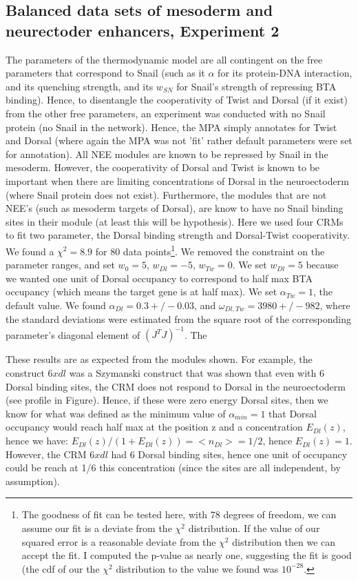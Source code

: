 \subsection{Balanced data sets of mesoderm and neurectoder enhancers, Experiment 2}
The parameters of the thermodynamic model are all contingent on the free parameters that correspond to Snail (such as it $\alpha$ for its protein-DNA interaction, and its quenching strength, and its $w_{SN}$ for Snail's strength of repressing BTA binding).  Hence, to disentangle the cooperativity of Twist and Dorsal (if it exist) from the other free parameters, an experiment was conducted with no Snail protein (no Snail in the network).  Hence, the MPA simply annotates for Twist and Dorsal (where again the MPA was not 'fit' rather default parameters were set for annotation).  All NEE modules are known to be repressed by Snail in the mesoderm.  However, the cooperativity of Dorsal and Twist is known to be important when there are limiting concentrations of Dorsal in the neuroectoderm (where Snail protein does not exist).  Furthermore, the modules that are not NEE's (such as mesoderm targets of Dorsal), are know to have no Snail binding sites in their module (at least this will be hypothesis).  Here we used four CRMs to fit two parameter, the Dorsal binding strength and Dorsal-Twist cooperativity.  We found a $\chi^2=8.9$ for 80 data points\footnote{The goodness of fit can be tested here, with 78 degrees of freedom, we can assume our fit is a deviate from the $\chi^2$ distribution.  If the value of our squared error is a reasonable deviate from the $\chi^2$ distribution then we can accept the fit.  I computed the p-value as nearly one, suggesting the fit is good (the cdf of our the $\chi^2$ distribution to the value we found was $10^{-28}$. }.    We removed the constraint on the parameter ranges, and set $w_0= 5$,  $w_{Dl}=-5$, $w_{Tw}=0$.  We set $w_{Dl}=5$ because we wanted one unit of Dorsal occupancy to correspond to half max BTA occupancy (which means the target gene is at half max).  We set $\alpha_{Tw}=1$, the default value.  We found $\alpha_{Dl}=0.3 +/- 0.03$, and $\omega_{Dl,Tw}=3980 +/- 982$, where the standard deviations were estimated from the square root of the corresponding parameter's diagonal element of $(J^TJ)^{-1}$.  The   

These results are as expected from the modules shown.  For example, the construct $6xdl$ was a Szymanski construct that was shown that even with 6 Dorsal binding sites, the CRM does not respond to Dorsal in the neuroectoderm (see profile in Figure).  Hence, if these were zero energy Dorsal sites, then we know for what was defined as the minimum value of $\alpha_{min}=1$ that Dorsal occupancy would reach half max at the position z and a concentration $E_{Dl}(z)$, hence we have: $E_{Dl}(z)/(1+E_{Dl}(z))=<n_{Dl}>= 1/2$, hence $E_{Dl}(z)= 1$.  However, the CRM $6xdl$ had 6 Dorsal binding sites, hence one unit of occupancy could be reach at 1/6 this concentration (since the sites are all independent, by assumption).

